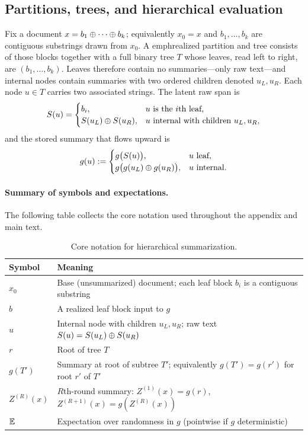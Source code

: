 \subsection{Partitions, trees, and hierarchical evaluation}
Fix a document $x=b_1\oplus\cdots\oplus b_k$; equivalently $x_0=x$ and $b_1,\ldots,b_k$ are contiguous substrings drawn from $x_0$. A \/emph{realized partition and tree} consists of those blocks together with a full binary tree $T$ whose leaves, read left to right, are $(b_1,\ldots,b_k)$. Leaves therefore contain no summaries—only raw text—and internal nodes contain summaries with two ordered children denoted $u_L,u_R$. Each node $u\in T$ carries two associated strings. The latent raw span is
\[
S(u)=
\begin{cases}
b_i,& u\text{ is the $i$th leaf},\\
S(u_L)\oplus S(u_R),& u\text{ internal with children }u_L,u_R,
\end{cases}
\]
and the stored summary that flows upward is
\[
g(u):=
\begin{cases}
g\big(S(u)\big),& u\text{ leaf},\\
g\big(g(u_L)\oplus g(u_R)\big),& u\text{ internal}.
\end{cases}
\]

\paragraph{Summary of symbols and expectations.}
The following table collects the core notation used throughout the appendix and main text.

\begin{table}[h]
\centering
\begin{tabular}{ll}
\toprule
Symbol & Meaning \\
\midrule
$x_0$ & Base (unsummarized) document; each leaf block $b_i$ is a contiguous substring \\
$b$ & A realized leaf block input to $g$ \\
$u$ & Internal node with children $u_L,u_R$; raw text $S(u)=S(u_L)\oplus S(u_R)$ \\
$r$ & Root of tree $T$ \\
$g(T')$ & Summary at root of subtree $T'$; equivalently $g(T')=g(r')$ for root $r'$ of $T'$ \\
$Z^{(R)}(x)$ & $R$th-round summary: $Z^{(1)}(x)=g(r)$, $Z^{(R+1)}(x)=g(Z^{(R)}(x))$ \\
$\mathbb{E}$ & Expectation over randomness in $g$ (pointwise if $g$ deterministic) \\
\bottomrule
\end{tabular}
\caption{Core notation for hierarchical summarization.}
\label{tab:notation}
\end{table}

